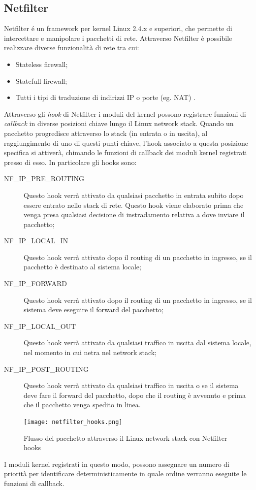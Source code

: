 \subsection{Netfilter}
\label{netfilter}
Netfilter \cite{netfilter,netfilterAndIptables} é un framework per kernel Linux 2.4.x e superiori, che permette di intercettare e manipolare i pacchetti di rete. Attraverso Netfilter è possibile realizzare diverse funzionalità di rete tra cui:
\begin{itemize}
    \item Stateless firewall;
    \item Statefull firewall;
    \item Tutti i tipi di traduzione di indirizzi IP o porte (eg. NAT) .
\end{itemize}
Attraverso gli \textit{hook} di Netfilter i moduli del kernel possono registrare funzioni di \textit{callback} in diverse posizioni chiave lungo il Linux network stack. Quando un pacchetto progredisce attraverso lo stack  (in entrata o in uscita), al raggiungimento di uno di questi punti chiave, l'hook associato a questa posizione specifica si attiverà, chimando le funzioni di  callback dei moduli kernel registrati presso di esso.
In particolare gli hooks sono:
\begin{description}
    \item[NF\_IP\_PRE\_ROUTING] Questo hook verrà attivato da qualsiasi pacchetto in entrata subito dopo essere entrato nello stack di rete. Questo hook viene elaborato prima che venga presa qualsiasi decisione di instradamento relativa a dove inviare il pacchetto;
    \item[NF\_IP\_LOCAL\_IN] Questo hook verrà attivato dopo il routing di un pacchetto in ingresso, se il pacchetto è destinato al sistema locale;
    \item[NF\_IP\_FORWARD] Questo hook verrà attivato dopo il routing di un pacchetto in ingresso, se il sistema deve eseguire il forward del pacchetto;
    \item[NF\_IP\_LOCAL\_OUT]  Questo hook verrà attivato da qualsiasi traffico in uscita dal sistema locale, nel momento in cui netra nel network stack;
    \item[NF\_IP\_POST\_ROUTING] Questo hook verrà attivato da qualsiasi traffico in uscita o se il sistema deve fare il forward del pacchetto, dopo che il routing è avvenuto e prima che il pacchetto venga spedito in linea.
\end{description}
\begin{figure}[hbtp]
    \centering
    \texttt{[image: netfilter\_hooks.png]}
    \caption{Flusso del pacchetto attraverso il Linux network stack con Netfilter hooks \cite{NetfilterHooks}}
    \label{fig:netfilter_hooks}
\end{figure}
I moduli kernel registrati in questo modo, possono assegnare un numero di priorità per identificare deterministicamente in quale ordine verranno eseguite le funzioni di callback.

